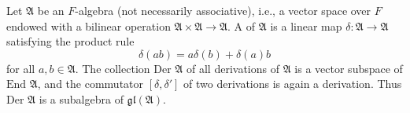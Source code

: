 Let $\mathfrak{A}$ be an $F$-algebra (not necessarily associative), i.e., a vector space over $F$ endowed with a bilinear operation $\mathfrak{A} \times \mathfrak{A} \rightarrow \mathfrak{A}$. A  of $\mathfrak{A}$ is a linear map $\delta: \mathfrak{A} \rightarrow \mathfrak{A}$ satisfying the product rule
$$\delta(ab) = a\delta(b) + \delta(a)b$$
for all $a, b \in \mathfrak{A}$. The collection $\text{Der } \mathfrak{A}$ of all derivations of $\mathfrak{A}$ is a vector subspace of $\text{End } \mathfrak{A}$, and the commutator $[\delta, \delta']$ of two derivations is again a derivation. Thus $\text{Der } \mathfrak{A}$ is a subalgebra of $\mathfrak{gl}(\mathfrak{A})$.
